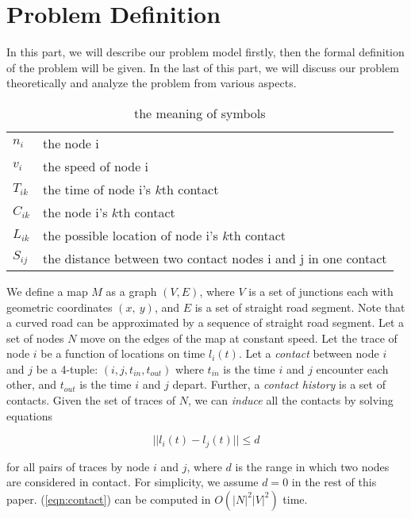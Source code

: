 \section{Problem Definition}
\label{sec:prob}
\newtheorem{definition}{Definition}


In this part, we will describe our problem model firstly, then the formal definition of the problem will be given.
In the last of this part, we will discuss our problem theoretically and analyze the problem from various aspects.

\begin{table}[htp]
\caption{the meaning of symbols}\label{analogy}
\centering
\begin{tabular}{|l|l|}
  \hline
  \hline
  $n_i$ & \footnotesize{the node i}\\
  $v_i$ & \footnotesize{the speed of node i}\\
  $T_{ik}$ & \footnotesize{the time of node i's $k$th contact}\\
  $C_{ik}$ & \footnotesize{the node i's $k$th contact}\\
  $L_{ik}$ & \footnotesize{the possible location of node i's $k$th contact}\\
  $S_{ij}$ & \footnotesize{the distance between two contact nodes i and j in one contact}\\
  \hline
\end{tabular}
\end{table}

We define a map $M$ as a graph $(V,E)$, where $V$ is a set of junctions each with geometric coordinates $(x,~ y)$,
and $E$ is a set of straight road segment. Note that a curved road can be approximated by a sequence of straight road
segment. Let a set of nodes $N$ move on the edges of the map at constant speed.
Let the trace of node $i$ be a function of locations on time $l_i(t)$.
Let a {\em contact} between node $i$ and $j$ be a 4-tuple: $(i, j, t_{in}, t_{out})$
where $t_{in}$ is the time $i$ and $j$ encounter each other, and $t_{out}$ is the time
$i$ and $j$ depart. Further, a {\em contact history} is a set of contacts.
Given the set of traces of $N$, we can {\em induce} all the contacts by solving equations

\begin{equation}
||l_i(t)-l_j(t)|| \leq d
\label{eqn:contact}
\end{equation}

\noindent
for all pairs of traces by node $i$ and $j$, where $d$ is the range in which two nodes are considered in contact.
For simplicity, we assume $d=0$ in the rest of this paper. (\ref{eqn:contact}) can be computed
in $O(|N|^2|V|^2)$ time.


